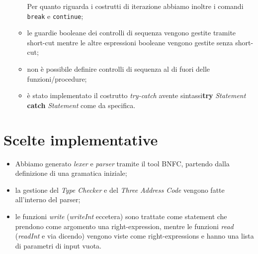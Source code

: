 \documentclass[12pt]{article}
\begin{document}
\begin{itemize}
\begin{itemize}
Per quanto riguarda i costrutti di iterazione abbiamo inoltre i comandi \texttt{break} e \texttt{continue};
		\item le guardie booleane dei controlli di sequenza vengono gestite tramite short-cut mentre le altre espressioni booleane vengono gestite senza short-cut;
		\item non è possibile definire controlli di sequenza al di fuori delle funzioni/procedure;
		\item è stato implementato il costrutto \textit{try-catch} avente sintassi\linebreak\textbf{try} \textit{Statement} \textbf{catch} \textit{Statement} come da specifica.
	\end{itemize}
\end{itemize}

\section*{Scelte implementative}
\begin{itemize}
\item Abbiamo generato \textit{lexer} e \textit{parser} tramite il tool BNFC, partendo dalla definizione di una gramatica iniziale;
\item la gestione del \textit{Type Checker} e del \textit{Three Address Code} vengono fatte all'interno del parser;
\item le funzioni \textit{write} (\textit{writeInt} eccetera) sono trattate come statement che prendono come argomento una right-expression, mentre le funzioni \textit{read} (\textit{readInt} e via dicendo) vengono viste come right-expressions e hanno una lista di parametri di input vuota.
\end{itemize}
\end{document}
